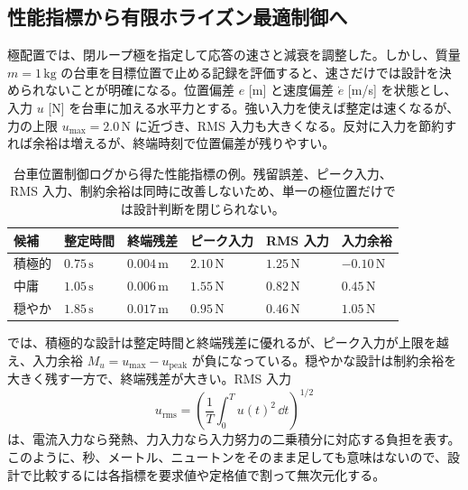 \subsection{性能指標から有限ホライズン最適制御へ}

極配置では、閉ループ極を指定して応答の速さと減衰を調整した。しかし、質量 $m=1\,\mathrm{kg}$ の台車を目標位置で止める記録を評価すると、速さだけでは設計を決められないことが明確になる。位置偏差 $e$ [m] と速度偏差 $\dot{e}$ [m/s] を状態とし、入力 $u$ [N] を台車に加える水平力とする。強い入力を使えば整定は速くなるが、力の上限 $u_{\max}=2.0\,\mathrm{N}$ に近づき、RMS 入力も大きくなる。反対に入力を節約すれば余裕は増えるが、終端時刻で位置偏差が残りやすい。

\begin{table}[tb]
  \centering
  \small
  \caption{台車位置制御ログから得た性能指標の例。残留誤差、ピーク入力、RMS 入力、制約余裕は同時に改善しないため、単一の極位置だけでは設計判断を閉じられない。}
  \label{tab:flow-four-performance-indices}
  \begin{tabular}{llllll}
    \hline
    候補 & 整定時間 & 終端残差 & ピーク入力 & RMS 入力 & 入力余裕 \\
    \hline
    積極的 & $0.75\,\mathrm{s}$ & $0.004\,\mathrm{m}$ & $2.10\,\mathrm{N}$ & $1.25\,\mathrm{N}$ & $-0.10\,\mathrm{N}$ \\
    中庸 & $1.05\,\mathrm{s}$ & $0.006\,\mathrm{m}$ & $1.55\,\mathrm{N}$ & $0.82\,\mathrm{N}$ & $0.45\,\mathrm{N}$ \\
    穏やか & $1.85\,\mathrm{s}$ & $0.017\,\mathrm{m}$ & $0.95\,\mathrm{N}$ & $0.46\,\mathrm{N}$ & $1.05\,\mathrm{N}$ \\
    \hline
  \end{tabular}
\end{table}

では、積極的な設計は整定時間と終端残差に優れるが、ピーク入力が上限を越え、入力余裕 $M_u=u_{\max}-u_{\mathrm{peak}}$ が負になっている。穏やかな設計は制約余裕を大きく残す一方で、終端残差が大きい。RMS 入力
\begin{equation}
  u_{\mathrm{rms}}
  =
  \left(
    \frac{1}{T}
    \int_0^T u(t)^2\,\dd t
  \right)^{1/2}
\end{equation}
は、電流入力なら発熱、力入力なら入力努力の二乗積分に対応する負担を表す。このように、秒、メートル、ニュートンをそのまま足しても意味はないので、設計で比較するには各指標を要求値や定格値で割って無次元化する。

